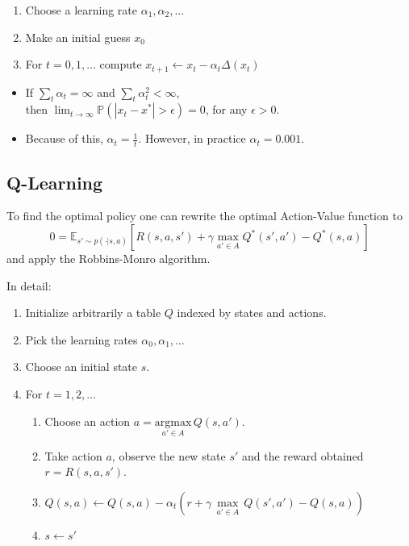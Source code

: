 \begin{enumerate}
    \item Choose a learning rate $\alpha_1, \alpha_2, \ldots$
    \item Make an initial guess $x_0$
    \item For $t={0,1,\ldots}$ compute $x_{t+1} \leftarrow x_t - \alpha_t \Delta(x_t)$
\end{enumerate}

\newpar{}
\begin{itemize}
    \item If $\sum_{t}\alpha_t = \infty$ and $\sum_{t}\alpha^2_t<\infty$, \\ then $\lim_{t\to\infty}\mathbb{P}(|x_t - x^*|>\epsilon) = 0$, for any $\epsilon > 0$.
    \item Because of this, $\alpha_t = \frac{1}{t}$. However, in practice $\alpha_t = 0.001$.
\end{itemize}

\subsection{Q-Learning}

To find the optimal policy one can rewrite the optimal Action-Value function to
\begin{equation*}
    0 = \mathbb{E}_{s'\sim p(\cdot|s,a)}\left[R(s,a,s') + \gamma \max_{a'\in A}Q^* (s',a') - Q^*(s,a)\right]
\end{equation*}
and apply the Robbins-Monro algorithm.


\newpar{}
In detail:
\begin{enumerate}
    \item Initialize arbitrarily a table $Q$ indexed by states and actions.
    \item Pick the learning rates $\alpha_0, \alpha_1, \ldots$
    \item Choose an initial state $s$.
    \item For $t = 1, 2, \ldots$
          \begin{enumerate}
              \item Choose an action $a = \underset{a'\in A}{\mathrm{argmax}}\,Q(s,a')$.
              \item Take action $a$, observe the new state $s'$ and the reward obtained $r=R(s,a,s')$.
              \item $Q(s,a) \leftarrow Q(s,a) - \alpha_t \left(r + \gamma\,\underset{a'\in A}{\max}\,Q(s',a')-Q(s,a)\right)$
              \item $s \leftarrow s'$
          \end{enumerate}
\end{enumerate}


